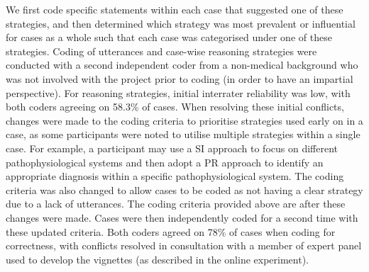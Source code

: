 \documentclass[a4paper, nobind]{templates/ociamthesis}
\begin{document}
We first code specific statements within each case that suggested one of these strategies, and then determined which strategy was most prevalent or influential for cases as a whole such that each case was categorised under one of these strategies. Coding of utterances and case-wise reasoning strategies were conducted with a second independent coder from a non-medical background who was not involved with the project prior to coding (in order to have an impartial perspective). For reasoning strategies, initial interrater reliability was low, with both coders agreeing on 58.3\% of cases. When resolving these initial conflicts, changes were made to the coding criteria to prioritise strategies used early on in a case, as some participants were noted to utilise multiple strategies within a single case. For example, a participant may use a SI approach to focus on different pathophysiological systems and then adopt a PR approach to identify an appropriate diagnosis within a specific pathophysiological system. The coding criteria was also changed to allow cases to be coded as not having a clear strategy due to a lack of utterances. The coding criteria provided above are after these changes were made. Cases were then independently coded for a second time with these updated criteria. Both coders agreed on 78\% of cases when coding for correctness, with conflicts resolved in consultation with a member of expert panel used to develop the vignettes (as described in the online experiment).\\
\end{document}
